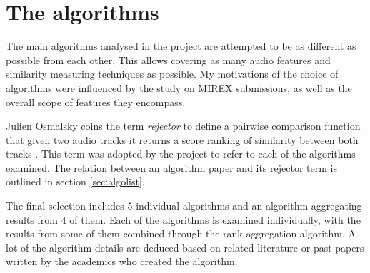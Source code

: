 
\chapter{The algorithms}
\label{chap:algorithms}
\ifpdf
    \graphicspath{{Algorithms/Figures/PNG/}{EvaluationTask/Figures/PDF/}{Algorithms/Figures/}}
\else
    \graphicspath{{Algorithms/Figures/EPS/}{EvaluationTask/Figures/}}
\fi


The main algorithms analysed in the project are attempted to be as different as
possible from each other. This allows covering as many audio features and
similarity measuring techniques as possible. My motivations of the choice of
algorithms were influenced by the study on MIREX submissions, as well as the
overall scope of features they encompass. 

Julien Osmalsky coins the term \textit{rejector} to define a pairwise comparison
function that given two audio tracks it returns a score ranking of similarity
between both tracks \cite{osmalsky2015combining}. This term was adopted by the
project to refer to each of the algorithms examined. The relation between an
algorithm paper and its rejector term is outlined in section \ref{sec:algolist}.

The final selection includes 5 individual algorithms and an algorithm
aggregating results from 4 of them. Each of the algorithms is examined
individually, with the results from some of them combined through the rank
aggregation algorithm. A lot of the algorithm details are deduced based on
related literature or past papers written by the academics who created the algorithm.


